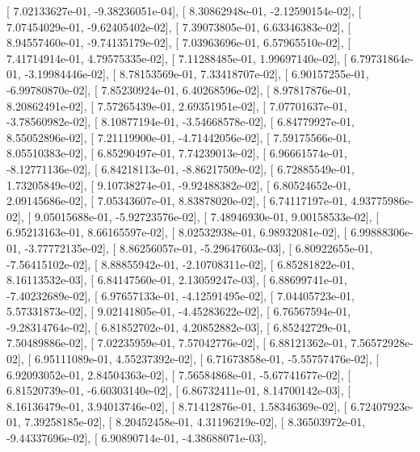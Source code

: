 \documentclass{article}
\begin{document}
       [  7.02133627e-01,  -9.38236051e-04],
       [  8.30862948e-01,  -2.12590154e-02],
       [  7.07454029e-01,  -9.62405402e-02],
       [  7.39073805e-01,   6.63346383e-02],
       [  8.94557460e-01,  -9.74135179e-02],
       [  7.03963696e-01,   6.57965510e-02],
       [  7.41714914e-01,   4.79575335e-02],
       [  7.11288485e-01,   1.99697140e-02],
       [  6.79731864e-01,  -3.19984446e-02],
       [  8.78153569e-01,   7.33418707e-02],
       [  6.90157255e-01,  -6.99780870e-02],
       [  7.85230924e-01,   6.40268596e-02],
       [  8.97817876e-01,   8.20862491e-02],
       [  7.57265439e-01,   2.69351951e-02],
       [  7.07701637e-01,  -3.78560982e-02],
       [  8.10877194e-01,  -3.54668578e-02],
       [  6.84779927e-01,   8.55052896e-02],
       [  7.21119900e-01,  -4.71442056e-02],
       [  7.59175566e-01,   8.05510383e-02],
       [  6.85290497e-01,   7.74239013e-02],
       [  6.96661574e-01,  -8.12771136e-02],
       [  6.84218113e-01,  -8.86217509e-02],
       [  6.72885549e-01,   1.73205849e-02],
       [  9.10738274e-01,  -9.92488382e-02],
       [  6.80524652e-01,   2.09145686e-02],
       [  7.05343607e-01,   8.83878020e-02],
       [  6.74117197e-01,   4.93775986e-02],
       [  9.05015688e-01,  -5.92723576e-02],
       [  7.48946930e-01,   9.00158533e-02],
       [  6.95213163e-01,   8.66165597e-02],
       [  8.02532938e-01,   6.98932081e-02],
       [  6.99888306e-01,  -3.77772135e-02],
       [  8.86256057e-01,  -5.29647603e-03],
       [  6.80922655e-01,  -7.56415102e-02],
       [  8.88855942e-01,  -2.10708311e-02],
       [  6.85281822e-01,   8.16113532e-03],
       [  6.84147560e-01,   2.13059247e-03],
       [  6.88699741e-01,  -7.40232689e-02],
       [  6.97657133e-01,  -4.12591495e-02],
       [  7.04405723e-01,   5.57331873e-02],
       [  9.02141805e-01,  -4.45283622e-02],
       [  6.76567594e-01,  -9.28314764e-02],
       [  6.81852702e-01,   4.20852882e-03],
       [  6.85242729e-01,   7.50489886e-02],
       [  7.02235959e-01,   7.57042776e-02],
       [  6.88121362e-01,   7.56572928e-02],
       [  6.95111089e-01,   4.55237392e-02],
       [  6.71673858e-01,  -5.55757476e-02],
       [  6.92093052e-01,   2.84504363e-02],
       [  7.56584868e-01,  -5.67741677e-02],
       [  6.81520739e-01,  -6.60303140e-02],
       [  6.86732411e-01,   8.14700142e-03],
       [  8.16136479e-01,   3.94013746e-02],
       [  8.71412876e-01,   1.58346369e-02],
       [  6.72407923e-01,   7.39258185e-02],
       [  8.20452458e-01,   4.31196219e-02],
       [  8.36503972e-01,  -9.44337696e-02],
       [  6.90890714e-01,  -4.38688071e-03],
\end{document}
